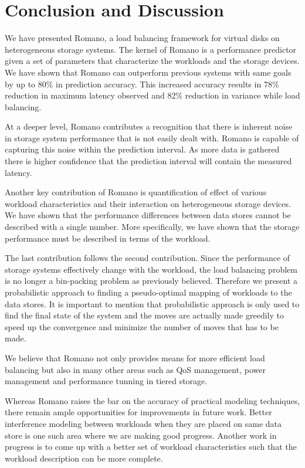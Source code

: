 \chapter{Conclusion and Discussion}
\label{conclusion_chapter}
We have presented Romano, a load balancing framework for virtual disks
on heterogeneous storage systems. The kernel of Romano is a performance
predictor given a set of parameters that characterize the workloads and
the storage devices. We have shown that Romano can outperform
previous systems with same goals by up to 80\% in prediction
accuracy. This increased accuracy results in 78\% reduction in maximum
latency observed and 82\% reduction in variance while load balancing.

At a deeper level, Romano contributes a recognition that there is
inherent noise in storage system performance that is not easily dealt
with. Romano is capable of capturing this noise within the prediction
interval. As more data is gathered there is higher confidence that the
prediction interval will contain the measured latency. 

Another key contribution of Romano is quantification of effect of
various workload characteristics and their interaction on heterogeneous
storage devices. 
We have shown that the performance differences between data stores cannot be described with a single number. More specifically, we have shown that the storage performance must be described in terms of the workload.

The last contribution follows the second contribution. Since the performance of storage systems effectively change with the workload, the load balancing problem is no longer a bin-packing problem as previously believed. 
Therefore we present a probabilistic approach to finding a pseudo-optimal mapping of workloads to the data stores. 
It is important to mention that probabilistic approach is only used to find the final state of the system and the moves are actually made greedily to speed up the convergence and minimize the number of moves that has to be made.

We believe that Romano not only provides means for more efficient load
balancing but also in many other areas such as QoS management, power management and performance tunning in tiered storage.

Whereas Romano raises the bar on the accuracy of practical modeling
techniques, there remain ample opportunities for improvements in
future work. Better interference modeling between workloads when they
are placed on same data store is one such area where we are making
good progress. Another work in progress is to come up with a better
set of workload characteristics such that the workload description can
be more complete.
